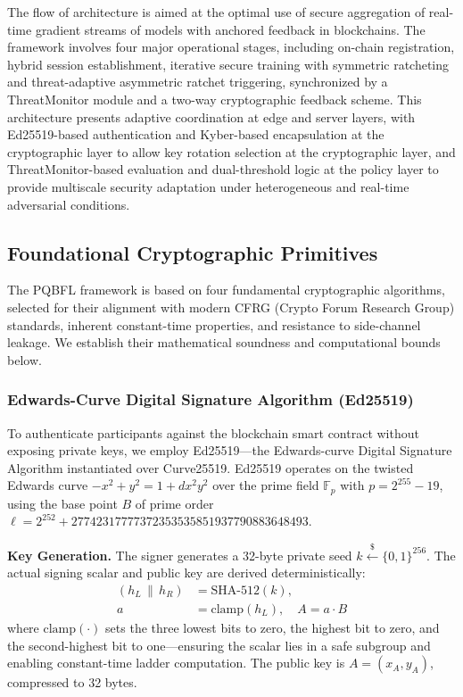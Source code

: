 \documentclass[journal, 10pt, twocolumn]{IEEEtran}
\begin{document}
The flow of architecture is aimed at the optimal use of secure aggregation of real-time gradient streams of models with anchored feedback in blockchains. The framework involves four major operational stages, including on-chain registration, hybrid session establishment, iterative secure training with symmetric ratcheting and threat-adaptive asymmetric ratchet triggering, synchronized by a ThreatMonitor module and a two-way cryptographic feedback scheme. This architecture presents adaptive coordination at edge and server layers, with Ed25519-based authentication and Kyber-based encapsulation at the cryptographic layer to allow key rotation selection at the cryptographic layer, and ThreatMonitor-based evaluation and dual-threshold logic at the policy layer to provide multiscale security adaptation under heterogeneous and real-time adversarial conditions.

\subsection{Foundational Cryptographic Primitives}
The PQBFL framework is based on four fundamental cryptographic algorithms, selected for their alignment with modern CFRG (Crypto Forum Research Group) standards, inherent constant-time properties, and resistance to side-channel leakage. We establish their mathematical soundness and computational bounds below.


\subsubsection{Edwards-Curve Digital Signature Algorithm (Ed25519)}
To authenticate participants against the blockchain smart contract without exposing private keys, we employ Ed25519---the Edwards-curve Digital Signature Algorithm instantiated over Curve25519. Ed25519 operates on the twisted Edwards curve $-x^2 + y^2 = 1 + dx^2y^2$ over the prime field $\mathbb{F}_p$ with $p = 2^{255} - 19$, using the base point $B$ of prime order $\ell = 2^{252} + 27742317777372353535851937790883648493$.

\textbf{Key Generation.} The signer generates a 32-byte private seed $k \xleftarrow{\$} \{0,1\}^{256}$. The actual signing scalar and public key are derived deterministically:
\begin{equation}
\begin{split}
(h_L \,\|\, h_R) &= \text{SHA-512}(k), \\
a &= \text{clamp}(h_L), \quad A = a \cdot B
\end{split}
\label{eq:ed25519_keygen}
\end{equation}
where $\text{clamp}(\cdot)$ sets the three lowest bits to zero, the highest bit to zero, and the second-highest bit to one---ensuring the scalar lies in a safe subgroup and enabling constant-time ladder computation. The public key is $A = (x_A, y_A)$, compressed to 32 bytes.
\end{document}
